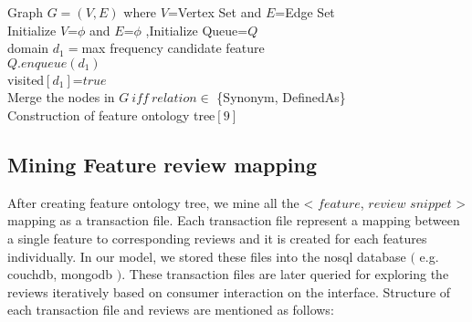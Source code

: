 \begin{algorithm}
	
	Graph $G=(V,E)$  where $V$=Vertex Set and $E$=Edge Set \\
	Initialize $V$=${ \phi }$ and $E$=${ \phi }$ ,Initialize Queue=$Q$ \\
	domain $d_{1}=$max frequency candidate feature \\
	$Q.enqueue(d_{1})$ \\
	visited$[d_{1}]$=$true$ \\
	
	Merge the nodes in $G\ iff\ relation \in$ \{Synonym, DefinedAs\}\\  
	\caption{Construction of feature ontology tree$[9]$}
\end{algorithm}


\subsection{Mining Feature review mapping}
After creating feature ontology tree, we mine all the < $feature$, $review$ $snippet$ > mapping as a transaction file. Each transaction file represent a mapping between a single feature to corresponding reviews and it is created for each features individually. In our model, we stored these files into the nosql database $($ e.g. couchdb, mongodb $)$. These transaction files are later queried for exploring the reviews iteratively based on consumer interaction on the interface. Structure of each transaction file and reviews are mentioned as follows:

